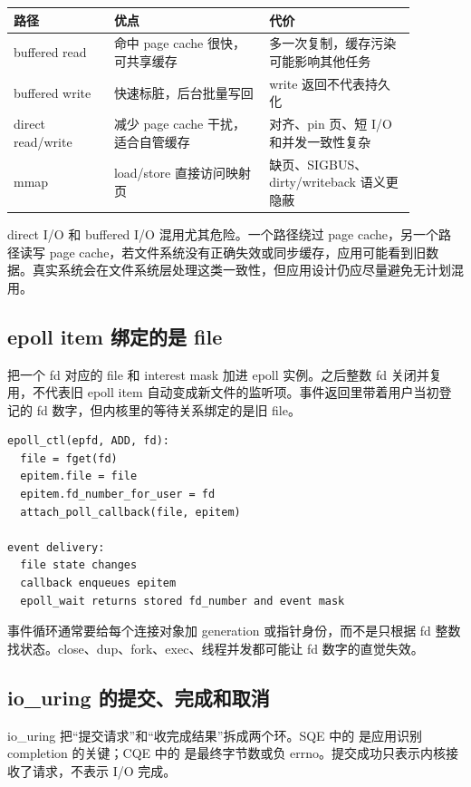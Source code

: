 \begin{longtable}{|p{0.22\linewidth}|p{0.34\linewidth}|p{0.32\linewidth}|}
\toprule
路径 & 优点 & 代价 \\
\midrule
buffered read & 命中 page cache 很快，可共享缓存 & 多一次复制，缓存污染可能影响其他任务 \\\tablerowrule
buffered write & 快速标脏，后台批量写回 & write 返回不代表持久化 \\\tablerowrule
direct read/write & 减少 page cache 干扰，适合自管缓存 & 对齐、pin 页、短 I/O 和并发一致性复杂 \\\tablerowrule
mmap & load/store 直接访问映射页 & 缺页、SIGBUS、dirty/writeback 语义更隐蔽 \\
\bottomrule
\end{longtable}

direct I/O 和 buffered I/O 混用尤其危险。一个路径绕过 page cache，另一个路径读写 page cache，若文件系统没有正确失效或同步缓存，应用可能看到旧数据。真实系统会在文件系统层处理这类一致性，但应用设计仍应尽量避免无计划混用。

\subsection{epoll item 绑定的是 file}

 把一个 fd 对应的 file 和 interest mask 加进 epoll 实例。之后整数 fd 关闭并复用，不代表旧 epoll item 自动变成新文件的监听项。事件返回里带着用户当初登记的 fd 数字，但内核里的等待关系绑定的是旧 file。

\begin{lstlisting}
epoll_ctl(epfd, ADD, fd):
  file = fget(fd)
  epitem.file = file
  epitem.fd_number_for_user = fd
  attach_poll_callback(file, epitem)

event delivery:
  file state changes
  callback enqueues epitem
  epoll_wait returns stored fd_number and event mask
\end{lstlisting}

事件循环通常要给每个连接对象加 generation 或指针身份，而不是只根据 fd 整数找状态。close、dup、fork、exec、线程并发都可能让 fd 数字的直觉失效。

\subsection{io\_uring 的提交、完成和取消}

io\_uring 把“提交请求”和“收完成结果”拆成两个环。SQE 中的  是应用识别 completion 的关键；CQE 中的  是最终字节数或负 errno。提交成功只表示内核接收了请求，不表示 I/O 完成。

